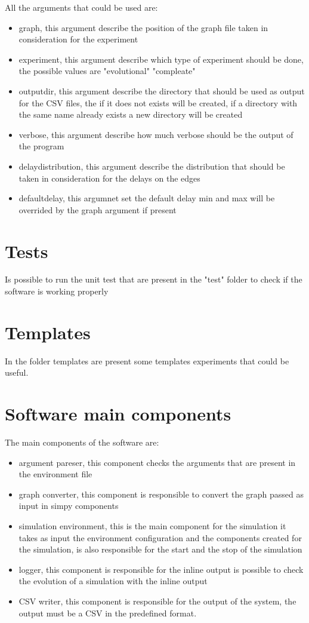 \documentclass[10pt,conference,letterpaper]{IEEEtran}
\begin{document}
All the arguments that could be used are:
\begin{itemize}
		\item graph, this argument describe the position of the graph file taken
			in consideration for the experiment
		\item experiment, this argument describe which type of experiment should
			be done, the possible values are "evolutional" "compleate"
		\item outputdir, this argument describe the directory that should be
			used as output for the CSV files, the if it does not exists will be
			created, if a directory with the same name already exists a new 
			directory will be created
		\item verbose, this argument describe how much verbose should be the
			output of the program
		\item delaydistribution, this argument describe the distribution that
			should be taken in consideration for the delays on the edges
		\item defaultdelay, this argumnet set the default delay min and max
			will be overrided by the graph argument if present
\end{itemize}

\section{Tests}
\label{sec:test}
Is possible to run the unit test that are present in the "test" folder to
check if the software is working properly

\section{Templates}
\label{sec:templates}
In the folder templates are present some templates experiments that could
be useful.

\section{Software main components}
\label{sec:softwarecomp}

The main components of the software are:
\begin{itemize}
		\item argument pareser, this component checks the arguments that are
			present in the environment file
		\item graph converter, this component is responsible to convert the
			graph passed as input in simpy components
		\item simulation environment, this is the main component for the simulation
			it takes as input the environment configuration and the components
			created for the simulation, is also responsible for the start and
			the stop of the simulation
		\item logger, this component is responsible for the inline output
			is possible to check the evolution of a simulation with the inline
			output
		\item CSV writer, this component is responsible for the output of the 
			system, the output must be a CSV in the predefined format.
\end{itemize}



\end{document}
